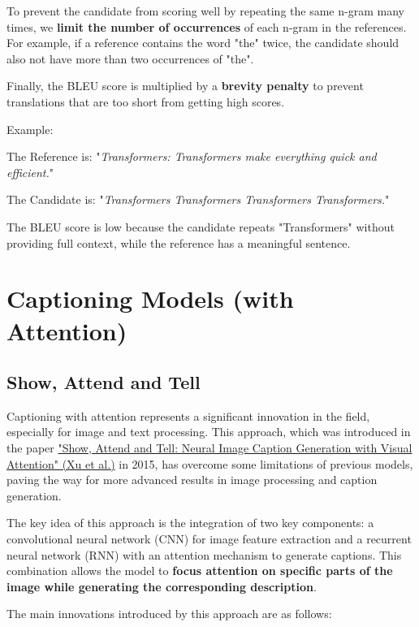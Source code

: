 To prevent the candidate from scoring well by repeating the same n-gram many times, we \textbf{limit the number of occurrences} of each n-gram in the references. For example, if a reference contains the word "the" twice, the candidate should also not have more than two occurrences of "the".

Finally, the BLEU score is multiplied by a \textbf{brevity penalty} to prevent translations that are too short from getting high scores. 

Example:

\; The Reference is: "\textit{Transformers: Transformers make everything quick and efficient.}" 

\; The Candidate is: "\textit{Transformers Transformers Transformers Transformers.}" \ 
 
The BLEU score is low because the candidate repeats "Transformers" without providing full context, while the reference has a meaningful sentence. 

\section{Captioning Models (with Attention)}

\subsection{Show, Attend and Tell}

Captioning with attention represents a significant innovation in the field, especially for image and text processing. This approach, which was introduced in the paper \href{https://arxiv.org/pdf/1502.03044}{"Show, Attend and Tell: Neural Image Caption Generation with Visual Attention" (Xu et al.)} in 2015, has overcome some limitations of previous models, paving the way for more advanced results in image processing and caption generation.

The key idea of this approach is the integration of two key components: a convolutional neural network (CNN) for image feature extraction and a recurrent neural network (RNN) with an attention mechanism to generate captions. This combination allows the model to \textbf{focus attention on specific parts of the image while generating the corresponding description}.

The main innovations introduced by this approach are as follows:

